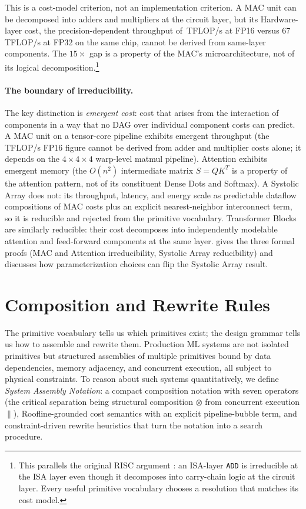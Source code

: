 \documentclass[10pt,twocolumn]{article}
\newcommand{\cvalint}[1]{\pgfmathprintnumber[fixed, precision=0, 1000 sep={\,}]{#1}}
\begin{document}
This is a cost-model criterion, not an implementation criterion. A MAC unit can be decomposed into adders and multipliers at the circuit layer, but its Hardware-layer cost, the precision-dependent throughput of \cvalint{\HhPeakTFLOPS}\,TFLOP/s at FP16 versus 67\,TFLOP/s at FP32 on the same chip, cannot be derived from same-layer components. The $15\times$ gap is a property of the MAC's microarchitecture, not of its logical decomposition.\footnote{This parallels the original RISC argument \citep{patterson1980}: an ISA-layer \texttt{ADD} is irreducible at the ISA layer even though it decomposes into carry-chain logic at the circuit layer. Every useful primitive vocabulary chooses a resolution that matches its cost model.}

\paragraph{The boundary of irreducibility.} The key distinction is \emph{emergent cost}: cost that arises from the interaction of components in a way that no DAG over individual component costs can predict. A MAC unit on a tensor-core pipeline exhibits emergent throughput (the \cvalint{\HhPeakTFLOPS}\,TFLOP/s FP16 figure cannot be derived from adder and multiplier costs alone; it depends on the $4{\times}4{\times}4$ warp-level matmul pipeline). Attention exhibits emergent memory (the $O(n^2)$ intermediate matrix $S = QK^T$ is a property of the attention pattern, not of its constituent Dense Dots and Softmax). A Systolic Array does not: its throughput, latency, and energy scale as predictable dataflow compositions of MAC costs plus an explicit nearest-neighbor interconnect term, so it is reducible and rejected from the primitive vocabulary. Transformer Blocks are similarly reducible: their cost decomposes into independently modelable attention and feed-forward components at the same layer.  gives the three formal proofs (MAC and Attention irreducibility, Systolic Array reducibility) and discusses how parameterization choices can flip the Systolic Array result.

\section{Composition and Rewrite Rules}
\label{sec:composition}

The primitive vocabulary tells us which primitives exist; the design grammar tells us how to assemble and rewrite them. Production ML systems are not isolated primitives but structured assemblies of multiple primitives bound by data dependencies, memory adjacency, and concurrent execution, all subject to physical constraints. To reason about such systems quantitatively, we define \emph{System Assembly Notation}: a compact composition notation with seven operators (the critical separation being structural composition $\otimes$ from concurrent execution $\parallel$), Roofline-grounded cost semantics with an explicit pipeline-bubble term, and constraint-driven rewrite heuristics that turn the notation into a search procedure.
\end{document}
